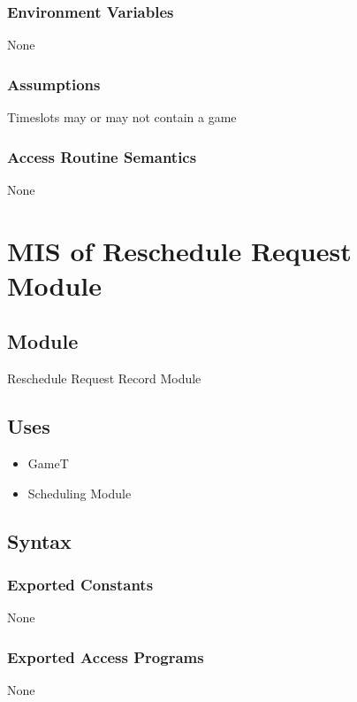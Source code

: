\documentclass[12pt, titlepage]{article}
\begin{document}
\subsubsection{Environment Variables}

None

\subsubsection{Assumptions}

Timeslots may or may not contain a game

\subsubsection{Access Routine Semantics}

None

\newpage

\section{MIS of Reschedule Request Module} \label{Reschedule}

\subsection{Module}

Reschedule Request Record Module

\subsection{Uses}
\begin{itemize}
  \item GameT
  \item Scheduling Module
\end{itemize}

\subsection{Syntax}

\subsubsection{Exported Constants}
None

\subsubsection{Exported Access Programs}
None
\end{document}
